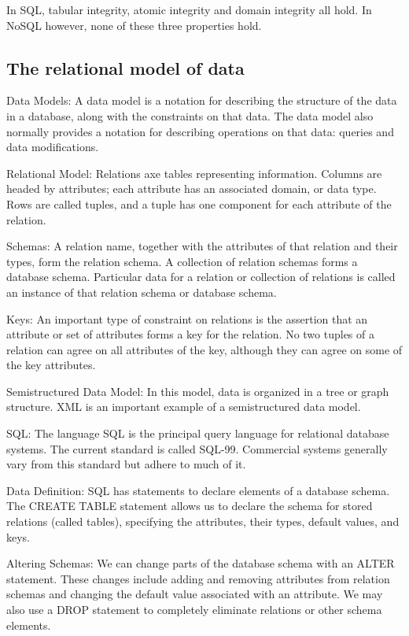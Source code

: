 \documentclass[11pt,oneside,a4paper]{article}
\begin{document}
In SQL, tabular integrity, atomic integrity and domain integrity all hold. In NoSQL however, none of these three properties hold.

\subsection{The relational model of data}

\begin{compactitem}
	\item Data Models: A data model is a notation for describing the structure of the data in a database, along with the constraints on that data. The data	model also normally provides a notation for describing operations on that data: queries and data modifications.
	\item Relational Model: Relations axe tables representing information. Columns are headed by attributes; each attribute has an associated domain, or	data type. Rows are called tuples, and a tuple has one component for each attribute of the relation.
	\item Schemas: A relation name, together with the attributes of that relation and their types, form the relation schema. A collection of relation schemas forms a database schema. Particular data for a relation or collection of relations is called an instance of that relation schema or database schema.
	\item Keys: An important type of constraint on relations is the assertion that an attribute or set of attributes forms a key for the relation. No two tuples of a relation can agree on all attributes of the key, although they can agree on some of the key attributes.
	\item Semistructured Data Model: In this model, data is organized in a tree or graph structure. XML is an important example of a semistructured data model.
	\item SQL: The language SQL is the principal query language for relational database systems. The current standard is called SQL-99. Commercial systems generally vary from this standard but adhere to much of it.
	\item Data Definition: SQL has statements to declare elements of a database schema. The CREATE TABLE statement allows us to declare the schema for stored relations (called tables), specifying the attributes, their types, default values, and keys.
	\item Altering Schemas: We can change parts of the database schema with an ALTER statement. These changes include adding and removing attributes from relation schemas and changing the default value associated with an attribute. We may also use a DROP statement to completely eliminate relations or other schema elements.

\end{compactitem}
\end{document}
